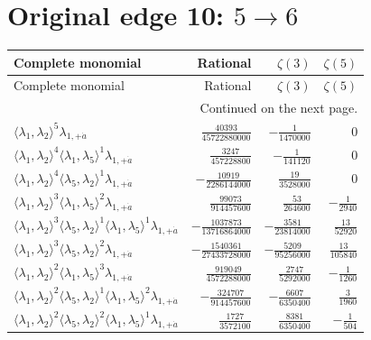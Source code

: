 \section{Original edge 10: $5\to 6$}
\begin{longtable}{@{}lrrr@{}}
\toprule
Complete monomial & Rational & $\zeta(3)$ & $\zeta(5)$ \\
\midrule\endfirsthead
\toprule Complete monomial & Rational & $\zeta(3)$ & $\zeta(5)$ \\
\midrule\endhead
\midrule\multicolumn{4}{r}{Continued on the next page.}\\\endfoot
\bottomrule\endlastfoot
$\langle\lambda_1,\lambda_2\rangle^{5}\lambda_{1,+\dot a}$ & $\frac{40393}{45722880000}$ & $-\frac{1}{1470000}$ & $0$ \\
$\langle\lambda_1,\lambda_2\rangle^{4}\langle\lambda_1,\lambda_5\rangle^{1}\lambda_{1,+\dot a}$ & $\frac{3247}{457228800}$ & $-\frac{1}{141120}$ & $0$ \\
$\langle\lambda_1,\lambda_2\rangle^{4}\langle\lambda_5,\lambda_2\rangle^{1}\lambda_{1,+\dot a}$ & $-\frac{10919}{2286144000}$ & $\frac{19}{3528000}$ & $0$ \\
$\langle\lambda_1,\lambda_2\rangle^{3}\langle\lambda_1,\lambda_5\rangle^{2}\lambda_{1,+\dot a}$ & $\frac{99073}{914457600}$ & $\frac{53}{264600}$ & $-\frac{1}{2940}$ \\
$\langle\lambda_1,\lambda_2\rangle^{3}\langle\lambda_5,\lambda_2\rangle^{1}\langle\lambda_1,\lambda_5\rangle^{1}\lambda_{1,+\dot a}$ & $-\frac{1037873}{13716864000}$ & $-\frac{3581}{23814000}$ & $\frac{13}{52920}$ \\
$\langle\lambda_1,\lambda_2\rangle^{3}\langle\lambda_5,\lambda_2\rangle^{2}\lambda_{1,+\dot a}$ & $-\frac{1540361}{27433728000}$ & $-\frac{5209}{95256000}$ & $\frac{13}{105840}$ \\
$\langle\lambda_1,\lambda_2\rangle^{2}\langle\lambda_1,\lambda_5\rangle^{3}\lambda_{1,+\dot a}$ & $\frac{919049}{4572288000}$ & $\frac{2747}{5292000}$ & $-\frac{1}{1260}$ \\
$\langle\lambda_1,\lambda_2\rangle^{2}\langle\lambda_5,\lambda_2\rangle^{1}\langle\lambda_1,\lambda_5\rangle^{2}\lambda_{1,+\dot a}$ & $-\frac{324707}{914457600}$ & $-\frac{6607}{6350400}$ & $\frac{3}{1960}$ \\
$\langle\lambda_1,\lambda_2\rangle^{2}\langle\lambda_5,\lambda_2\rangle^{2}\langle\lambda_1,\lambda_5\rangle^{1}\lambda_{1,+\dot a}$ & $\frac{1727}{3572100}$ & $\frac{8381}{6350400}$ & $-\frac{1}{504}$ \\

\end{longtable}
